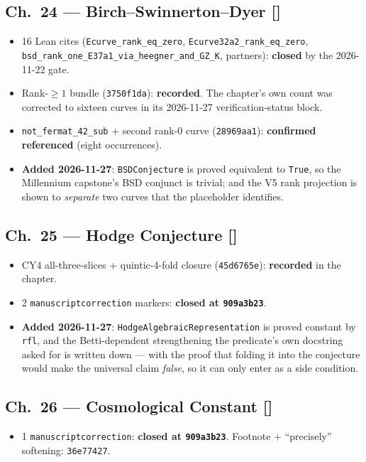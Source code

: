 \subsection*{Ch.~24 --- Birch--Swinnerton--Dyer \hfill [\checkmark]}
\begin{itemize}
\item 16 Lean cites (\texttt{Ecurve\_rank\_eq\_zero},
\texttt{Ecurve32a2\_rank\_eq\_zero},
\texttt{bsd\_rank\_one\_E37a1\_via\_heegner\_and\_GZ\_K}, partners):
\textbf{closed} by the 2026-11-22 gate.
\item Rank-$\geq 1$ bundle (\texttt{3750f1da}): \textbf{recorded}. The
chapter's own count was corrected to sixteen curves in its 2026-11-27
verification-status block.
\item \texttt{not\_fermat\_42\_sub} + second rank-0 curve
(\texttt{28969aa1}): \textbf{confirmed referenced} (eight occurrences).
\item \textbf{Added 2026-11-27}: \texttt{BSDConjecture} is proved equivalent to
\texttt{True}, so the Millennium capstone's BSD conjunct is trivial; and the
V5 rank projection is shown to \emph{separate} two curves that the placeholder
identifies.
\end{itemize}

\subsection*{Ch.~25 --- Hodge Conjecture \hfill [\checkmark]}
\begin{itemize}
\item CY4 all-three-slices + quintic-4-fold closure (\texttt{45d6765e}):
\textbf{recorded} in the chapter.
\item 2 \texttt{manuscriptcorrection} markers: \textbf{closed at
\texttt{909a3b23}}.
\item \textbf{Added 2026-11-27}: \texttt{HodgeAlgebraicRepresentation} is
proved constant by \texttt{rfl}, and the Betti-dependent strengthening the
predicate's own docstring asked for is written down --- with the proof that
folding it into the conjecture would make the universal claim \emph{false}, so
it can only enter as a side condition.
\end{itemize}

\subsection*{Ch.~26 --- Cosmological Constant \hfill [\checkmark]}
\begin{itemize}
\item 1 \texttt{manuscriptcorrection}: \textbf{closed at \texttt{909a3b23}}.
Footnote + ``precisely'' softening: \texttt{36e77427}.
\end{itemize}

